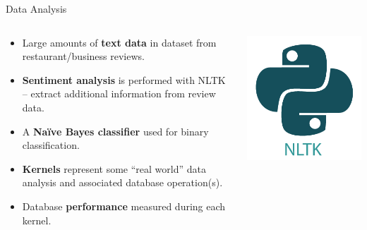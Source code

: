 \begin{frame}{Data Analysis}
    \begin{columns}
        \begin{column}{.7\textwidth}
            \begin{itemize}
                \item Large amounts of \textbf{text data} in dataset from restaurant/business reviews.
                \item \textbf{Sentiment analysis} is performed with NLTK -- extract additional information from review data.
                \item A \textbf{Na\"ive Bayes classifier} used for binary classification.
                \item \textbf{Kernels} represent some ``real world'' data analysis and associated database operation(s).
                \item Database \textbf{performance} measured during each kernel.
            \end{itemize}
            \end{column}%
            \hfill%
            \begin{column}{.29\textwidth}
            \centering
            \includegraphics[width=\columnwidth]{img/nltk-logo.png}
        \end{column}%
    \end{columns}
    \vfill
    \parnotes
\end{frame}


